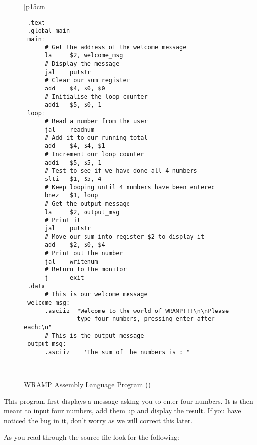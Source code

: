 %
%
\begin{figure}[btp]
\begin{center}
\begin{tabular}{|p{15cm}|}
\hline
\begin{verbatim}
 .text
 .global main
 main:
      # Get the address of the welcome message
      la     $2, welcome_msg
      # Display the message
      jal    putstr
      # Clear our sum register
      add    $4, $0, $0
      # Initialise the loop counter
      addi   $5, $0, 1
 loop:
      # Read a number from the user
      jal    readnum
      # Add it to our running total
      add    $4, $4, $1
      # Increment our loop counter
      addi   $5, $5, 1
      # Test to see if we have done all 4 numbers
      slti   $1, $5, 4
      # Keep looping until 4 numbers have been entered
      bnez   $1, loop
      # Get the output message
      la     $2, output_msg
      # Print it
      jal    putstr
      # Move our sum into register $2 to display it
      add    $2, $0, $4
      # Print out the number
      jal    writenum
      # Return to the monitor
      j      exit
 .data
      # This is our welcome message
 welcome_msg:
      .asciiz  "Welcome to the world of WRAMP!!!\n\nPlease
               type four numbers, pressing enter after each:\n"
      # This is the output message
 output_msg:
      .asciiz    "The sum of the numbers is : "
\end{verbatim}%

\\
\hline
\end{tabular}
\end{center}
\caption{WRAMP Assembly Language Program ()}
\label{simple_prog}
\end{figure}
%

This program first displays a message asking you to enter four numbers. It
is then meant to input four numbers, add them up and display the result. 
If you have noticed the bug in it, don't worry as we will correct this later.

As you read through the source file look for the following:

